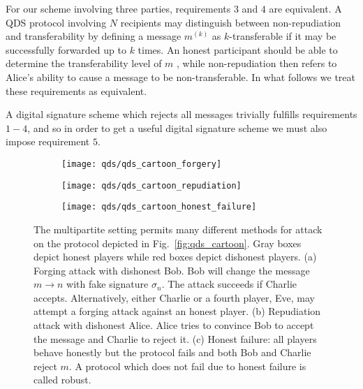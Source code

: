 For our scheme involving three parties, requirements $3$ and $4$ are equivalent. A QDS protocol involving $N$ recipients may distinguish between non-repudiation and transferability by defining a message $m^{\left(k\right)}$ as $k$-transferable if it may be successfully forwarded up to $k$ times. An honest participant should be able to determine the transferability level of $m$ \cite{Arrazola2015}, while non-repudiation then refers to Alice's ability to cause a message to be non-transferable. In what follows we treat these requirements as equivalent.

A digital signature scheme which rejects all messages trivially fulfills requirements $1-4$, and so in order to get a useful digital signature scheme we must also impose requirement $5$.

\begin{figure}[htp]
\captionsetup{width=0.8\linewidth}
\centering
	\begin{subfigure}{\linewidth}
		\centering
		\texttt{[image: qds/qds\_cartoon\_forgery]}
		\caption{\label{fig:attacks_forgery}}
	\end{subfigure}
	\begin{subfigure}{\linewidth}
		\centering
		\texttt{[image: qds/qds\_cartoon\_repudiation]}
		\caption{\label{fig:attacks_repudiation}}
	\end{subfigure}
	\begin{subfigure}{\linewidth}
		\centering
		\texttt{[image: qds/qds\_cartoon\_honest\_failure]}
		\caption{\label{fig:attacks_robustness}}
	\end{subfigure}
\caption{\label{fig:qds_attacks} The multipartite setting permits many different methods for attack on the protocol depicted in Fig.~\ref{fig:qds_cartoon}. Gray boxes depict honest players while red boxes depict dishonest players. (a) Forging attack with dishonest Bob. Bob will change the message $m \rightarrow n$ with fake signature $\sigma_n$. The attack succeeds if Charlie accepts. Alternatively, either Charlie or a fourth player, Eve, may attempt a forging attack against an honest player. (b) Repudiation attack with dishonest Alice. Alice tries to convince Bob to accept the message and Charlie to reject it. (c) Honest failure: all players behave honestly but the protocol fails and both Bob and Charlie reject $m$. A protocol which does not fail due to honest failure is called robust.}
\end{figure}

